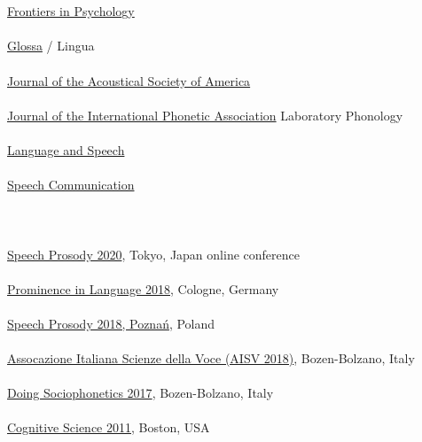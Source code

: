 \documentclass[a4paper,11pt]{article}
\begin{document}
\newpage
\section*{ }
\href{https://www.frontiersin.org/journals/psychology}{Frontiers in Psychology}\\\\
\href{https://www.glossa-journal.org/}{Glossa} / Lingua\\\\
\href{https://asa.scitation.org/journal/jas}{Journal of the Acoustical Society of America}\\\\
\href{https://www.cambridge.org/core/journals/journal-of-the-international-phonetic-association}{Journal of the International Phonetic Association}
{Laboratory Phonology}\\\\
\href{https://www.journal-labphon.org/}{Language and Speech}\\\\
\href{https://www.journals.elsevier.com/speech-communication}{Speech Communication}\\\\

\section*{}
\href{https://sp2020.jpn.org/}{Speech Prosody 2020}, Tokyo, Japan online conference\\\\
\href{https://sfb1252.uni-koeln.de/prominenceconference2018.html}{Prominence in Language 2018}, Cologne, Germany\\\\
\href{http://sp9.home.amu.edu.pl/}{Speech Prosody 2018, Pozna\'{n}}, Poland\\\\
\href{https://aisv2018.events.unibz.it/}{Assocazione Italiana Scienze della Voce (AISV 2018)}, Bozen-Bolzano, Italy\\\\
\href{https://sites.google.com/site/sopho2017/}{Doing Sociophonetics 2017}, Bozen-Bolzano, Italy\\\\
\href{https://mindmodeling.org/cogsci2011/}{Cognitive Science 2011}, Boston, USA\\\\
\end{document}
